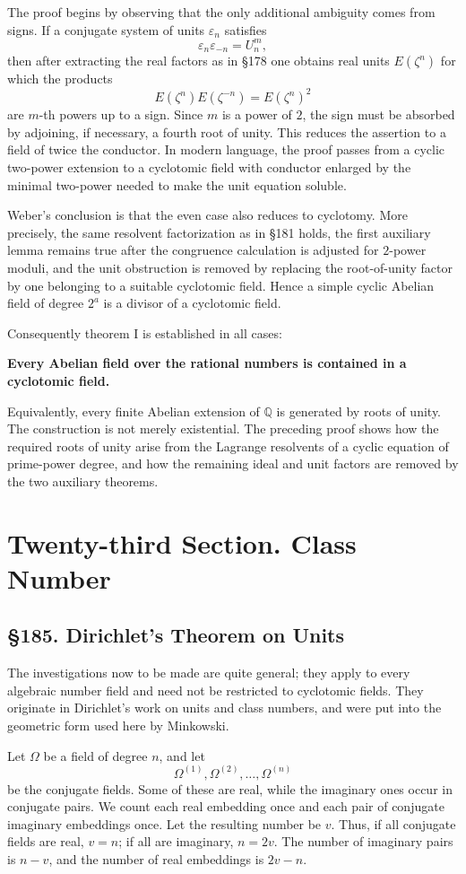 \documentclass[11pt,a4paper]{book}
\newcommand{\webersection}[2]{\clearpage\section*{\S #1. #2}}
\newcommand{\booktitle}[1]{\clearpage\chapter*{#1}}
\newcommand{\zetaS}{\zeta}
\begin{document}
The proof begins by observing that the only additional ambiguity comes from signs.  If a conjugate system of units \(\varepsilon_n\) satisfies
\[
  \varepsilon_n\varepsilon_{-n}=U_n^m,
\tag{1}
\]
then after extracting the real factors as in \S178 one obtains real units \(E(\zetaS^n)\) for which the products
\[
  E(\zetaS^n)E(\zetaS^{-n})=E(\zetaS^n)^2
\]
are \(m\)-th powers up to a sign.  Since \(m\) is a power of \(2\), the sign must be absorbed by adjoining, if necessary, a fourth root of unity.  This reduces the assertion to a field of twice the conductor.  In modern language, the proof passes from a cyclic two-power extension to a cyclotomic field with conductor enlarged by the minimal two-power needed to make the unit equation soluble.

Weber's conclusion is that the even case also reduces to cyclotomy.  More precisely, the same resolvent factorization as in \S181 holds, the first auxiliary lemma remains true after the congruence calculation is adjusted for \(2\)-power moduli, and the unit obstruction is removed by replacing the root-of-unity factor by one belonging to a suitable cyclotomic field.  Hence a simple cyclic Abelian field of degree \(2^a\) is a divisor of a cyclotomic field.

Consequently theorem I is established in all cases:

\textbf{Every Abelian field over the rational numbers is contained in a cyclotomic field.}

Equivalently, every finite Abelian extension of \(\mathbb Q\) is generated by roots of unity.  The construction is not merely existential.  The preceding proof shows how the required roots of unity arise from the Lagrange resolvents of a cyclic equation of prime-power degree, and how the remaining ideal and unit factors are removed by the two auxiliary theorems.

\booktitle{Twenty-third Section. Class Number}

\webersection{185}{Dirichlet's Theorem on Units}

The investigations now to be made are quite general; they apply to every algebraic number field and need not be restricted to cyclotomic fields.  They originate in Dirichlet's work on units and class numbers, and were put into the geometric form used here by Minkowski.

Let \(\Omega\) be a field of degree \(n\), and let
\[
  \Omega^{(1)},\Omega^{(2)},\ldots,\Omega^{(n)}
\]
be the conjugate fields.  Some of these are real, while the imaginary ones occur in conjugate pairs.  We count each real embedding once and each pair of conjugate imaginary embeddings once.  Let the resulting number be \(v\).  Thus, if all conjugate fields are real, \(v=n\); if all are imaginary, \(n=2v\).  The number of imaginary pairs is \(n-v\), and the number of real embeddings is \(2v-n\).
\end{document}

